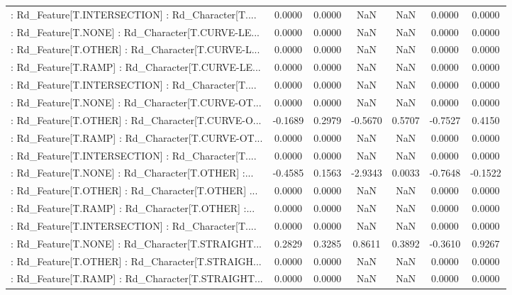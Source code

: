 \begin{longtable}{p{4cm}cccccc}
 : Rd\_Feature[T.INTERSECTION] : Rd\_Character[T.... &  0.0000 &    0.0000 &     NaN &          NaN &  0.0000 &  0.0000 \\
 : Rd\_Feature[T.NONE] : Rd\_Character[T.CURVE-LE... &  0.0000 &    0.0000 &     NaN &          NaN &  0.0000 &  0.0000 \\
 : Rd\_Feature[T.OTHER] : Rd\_Character[T.CURVE-L... &  0.0000 &    0.0000 &     NaN &          NaN &  0.0000 &  0.0000 \\
 : Rd\_Feature[T.RAMP] : Rd\_Character[T.CURVE-LE... &  0.0000 &    0.0000 &     NaN &          NaN &  0.0000 &  0.0000 \\
 : Rd\_Feature[T.INTERSECTION] : Rd\_Character[T.... &  0.0000 &    0.0000 &     NaN &          NaN &  0.0000 &  0.0000 \\
 : Rd\_Feature[T.NONE] : Rd\_Character[T.CURVE-OT... &  0.0000 &    0.0000 &     NaN &          NaN &  0.0000 &  0.0000 \\
 : Rd\_Feature[T.OTHER] : Rd\_Character[T.CURVE-O... & -0.1689 &    0.2979 & -0.5670 &       0.5707 & -0.7527 &  0.4150 \\
 : Rd\_Feature[T.RAMP] : Rd\_Character[T.CURVE-OT... &  0.0000 &    0.0000 &     NaN &          NaN &  0.0000 &  0.0000 \\
 : Rd\_Feature[T.INTERSECTION] : Rd\_Character[T.... &  0.0000 &    0.0000 &     NaN &          NaN &  0.0000 &  0.0000 \\
 : Rd\_Feature[T.NONE] : Rd\_Character[T.OTHER] :... & -0.4585 &    0.1563 & -2.9343 &       0.0033 & -0.7648 & -0.1522 \\
 : Rd\_Feature[T.OTHER] : Rd\_Character[T.OTHER] ... &  0.0000 &    0.0000 &     NaN &          NaN &  0.0000 &  0.0000 \\
 : Rd\_Feature[T.RAMP] : Rd\_Character[T.OTHER] :... &  0.0000 &    0.0000 &     NaN &          NaN &  0.0000 &  0.0000 \\
 : Rd\_Feature[T.INTERSECTION] : Rd\_Character[T.... &  0.0000 &    0.0000 &     NaN &          NaN &  0.0000 &  0.0000 \\
 : Rd\_Feature[T.NONE] : Rd\_Character[T.STRAIGHT... &  0.2829 &    0.3285 &  0.8611 &       0.3892 & -0.3610 &  0.9267 \\
 : Rd\_Feature[T.OTHER] : Rd\_Character[T.STRAIGH... &  0.0000 &    0.0000 &     NaN &          NaN &  0.0000 &  0.0000 \\
 : Rd\_Feature[T.RAMP] : Rd\_Character[T.STRAIGHT... &  0.0000 &    0.0000 &     NaN &          NaN &  0.0000 &  0.0000 \\

\end{longtable}
